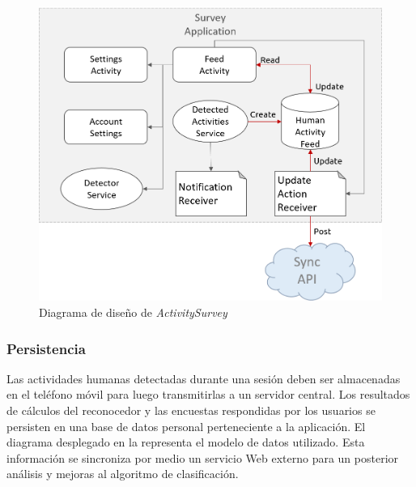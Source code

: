 \begin{figure}[H]
\begin{centering}
\includegraphics[width=1\columnwidth]{capitulo-5/graphics/act_surv_diag}
\par\end{centering}
\caption[Diagrama de diseño de ActivitySurvey]{\label{fig5:act-surv-diag}Diagrama de diseño de \emph{ActivitySurvey}}

\end{figure}


\subsubsection{Persistencia}

Las actividades humanas detectadas durante una sesión deben ser almacenadas
en el teléfono móvil para luego transmitirlas a un servidor central.
Los resultados de cálculos del reconocedor y las encuestas respondidas
por los usuarios se persisten en una base de datos personal perteneciente
a la aplicación. El diagrama desplegado en la 
representa el modelo de datos utilizado. Esta información se sincroniza
por medio un servicio Web externo para un posterior análisis y mejoras
al algoritmo de clasificación.

